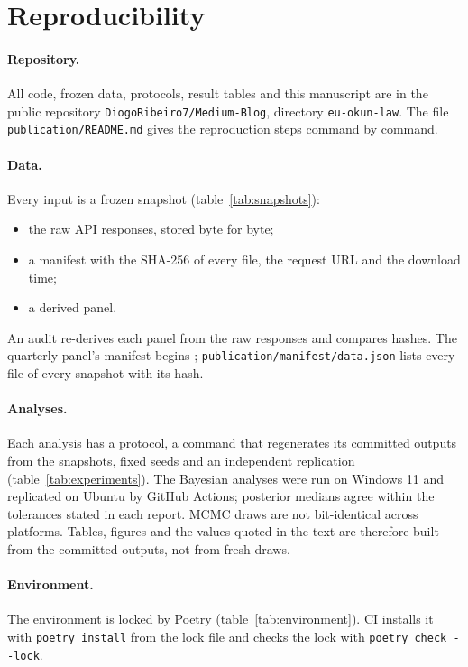 \section{Reproducibility}\label{app:repro}

\paragraph{Repository.} All code, frozen data, protocols, result tables and this
manuscript are in the public repository \texttt{DiogoRibeiro7/Medium-Blog}, directory
\texttt{eu-okun-law}. The file \texttt{publication/README.md} gives the reproduction
steps command by command.

\paragraph{Data.} Every input is a frozen snapshot (table~\ref{tab:snapshots}):
\begin{itemize}
  \item the raw API responses, stored byte for byte;
  \item a manifest with the SHA-256 of every file, the request URL and the download time;
  \item a derived panel.
\end{itemize}
An audit re-derives each panel from the raw responses and compares hashes. The quarterly
panel's manifest begins ; \texttt{publication/manifest/data.json} lists
every file of every snapshot with its hash.

\paragraph{Analyses.} Each analysis has a protocol, a command that regenerates its
committed outputs from the snapshots, fixed seeds and an independent replication
(table~\ref{tab:experiments}). The Bayesian analyses were run on Windows 11 and replicated
on Ubuntu by GitHub Actions; posterior medians agree within the tolerances stated in each
report. MCMC draws are not bit-identical across platforms. Tables, figures and the values
quoted in the text are therefore built from the committed outputs, not from fresh draws.

\paragraph{Environment.} The environment is locked by Poetry (table~\ref{tab:environment}).
CI installs it with \texttt{poetry install} from the lock file and checks the lock with
\verb|poetry check --lock|.

